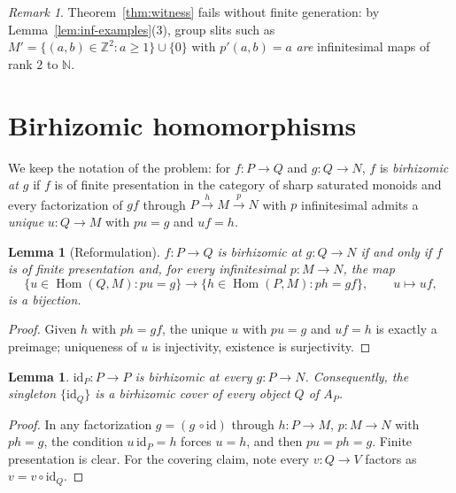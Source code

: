 \documentclass[11pt]{amsart}
\theoremstyle{plain}
\newtheorem{lemma}[theorem]{Lemma}
\theoremstyle{remark}
\newtheorem{remark}[theorem]{Remark}
\theoremstyle{definition}
\numberwithin{equation}{section}
\begin{document}
\begin{remark}
Theorem~\ref{thm:witness} fails without finite generation: by
Lemma~\ref{lem:inf-examples}(3), group slits such as
$M'=\{(a,b)\in\mathbb Z^2: a\ge 1\}\cup\{0\}$ with
$p'(a,b)=a$ \emph{are} infinitesimal maps of rank $2$ to $\mathbb N$.
\end{remark}

\section{Birhizomic homomorphisms}

We keep the notation of the problem: for $f\colon P\to Q$ and
$g\colon Q\to N$, $f$ is \emph{birhizomic at $g$} if $f$ is of finite
presentation in the category of sharp saturated monoids and every
factorization of $gf$ through $P\xrightarrow{h}M\xrightarrow{p}N$ with $p$
infinitesimal admits a \emph{unique} $u\colon Q\to M$ with $pu=g$ and
$uf=h$.

\begin{lemma}[Reformulation]\label{lem:reform}
$f\colon P\to Q$ is birhizomic at $g\colon Q\to N$ if and only if $f$ is of
finite presentation and, for every infinitesimal $p\colon M\to N$, the map
\[
\{u\in\operatorname{Hom}(Q,M): pu=g\}\longrightarrow
\{h\in\operatorname{Hom}(P,M): ph=gf\},\qquad u\mapsto uf,
\]
is a bijection.
\end{lemma}
\begin{proof}
Given $h$ with $ph=gf$, the unique $u$ with $pu=g$ and $uf=h$ is exactly a
preimage; uniqueness of $u$ is injectivity, existence is surjectivity.
\end{proof}

\begin{lemma}\label{lem:id-birh}
$\mathrm{id}_P\colon P\to P$ is birhizomic at every $g\colon P\to N$.
Consequently, the singleton $\{\mathrm{id}_Q\}$ is a birhizomic cover of
every object $Q$ of $A_P$.
\end{lemma}
\begin{proof}
In any factorization $g=(g\,\circ\mathrm{id})$ through
$h\colon P\to M$, $p\colon M\to N$ with $ph=g$, the condition
$u\,\mathrm{id}_P=h$ forces $u=h$, and then $pu=ph=g$.  Finite
presentation is clear.  For the covering claim, note every
$v\colon Q\to V$ factors as $v=v\circ\mathrm{id}_Q$.
\end{proof}
\end{document}
